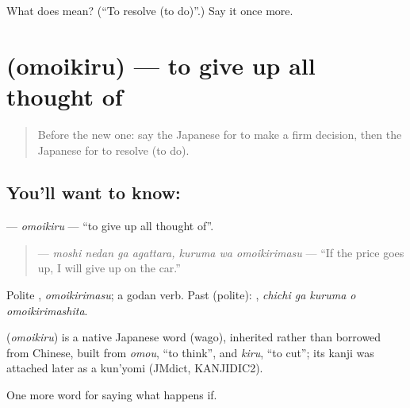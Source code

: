 \begin{tcolorbox}[breakable,colback=teal!4,colframe=teal!35!black,title={Before you move on}]
What does  mean? (\textquotedblleft{}To resolve (to do)\textquotedblright{}.) Say it once more.
\end{tcolorbox}
\section[\texorpdfstring{\ja{おもいきる} (omoikiru)}{おもいきる (omoikiru)}]{ (omoikiru) — to give up all thought of}

\label{lesson:JA-C517-omoikiru}



\begin{quote}
Before the new one: say the Japanese for to make a firm decision, then the Japanese for to resolve (to do).
\end{quote}

\subsection*{You'll want to know: }
\textbf{} — \emph{omoikiru} — \textquotedblleft{}to give up all thought of\textquotedblright{}.

\begin{quote}
\textbf{   } — \emph{moshi nedan ga agattara, kuruma wa omoikirimasu} — \textquotedblleft{}If the price goes up, I will give up on the car.\textquotedblright{}
\end{quote}

Polite \textbf{}, \emph{omoikirimasu}; a godan verb. Past (polite): \textbf{  }, \emph{chichi ga kuruma o omoikirimashita}.

\begin{cousinweb}
\textbf{} (\emph{omoikiru}) is a native Japanese word (wago), inherited rather than borrowed from Chinese, built from \emph{omou}, \textquotedblleft{}to think\textquotedblright{}, and \emph{kiru}, \textquotedblleft{}to cut\textquotedblright{}; its kanji was attached later as a kun'yomi (JMdict, KANJIDIC2).
\end{cousinweb}

\begin{grammarlens}[title={What you've built}]
One more word for saying what happens if.
\end{grammarlens}

